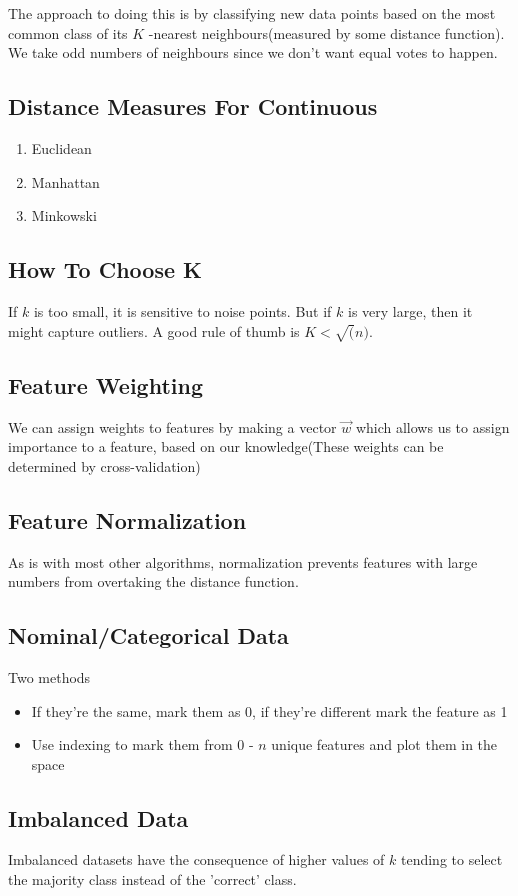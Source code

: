 \documentclass[11pt]{article}
\begin{document}
The approach to doing this is by classifying new data points based on the most common class of its \(K\) -nearest neighbours(measured by some distance function). We take odd numbers of neighbours since we don't want equal votes to happen.
\subsection{Distance Measures For Continuous}
\label{sec:orgc9f5f65}
\begin{enumerate}
\item Euclidean
\item Manhattan
\item Minkowski
\end{enumerate}
\subsection{How To Choose K}
\label{sec:orgd4be14a}
If \(k\) is too small, it is sensitive to noise points. But if \(k\) is very large, then it might capture outliers. A good rule of thumb is \(K < \sqrt(n)\).
\subsection{Feature Weighting}
\label{sec:orgd5a950e}
We can assign weights to features by making a vector \(\vec{w}\) which allows us to assign importance to a feature, based on our knowledge(These weights can be determined by cross-validation)
\subsection{Feature Normalization}
\label{sec:orgac2c388}
As is with most other algorithms, normalization prevents features with large numbers from overtaking the distance function.
\subsection{Nominal/Categorical Data}
\label{sec:org4fd6332}
Two methods
\begin{itemize}
\item If they're the same, mark them as 0, if they're different mark the feature as 1
\item Use indexing to mark them from 0 - \(n\) unique features and plot them in the space
\end{itemize}
\subsection{Imbalanced Data}
\label{sec:org7c4b4cc}
Imbalanced datasets have the consequence of higher values of \(k\) tending to select the majority class instead of the 'correct' class.
\end{document}
